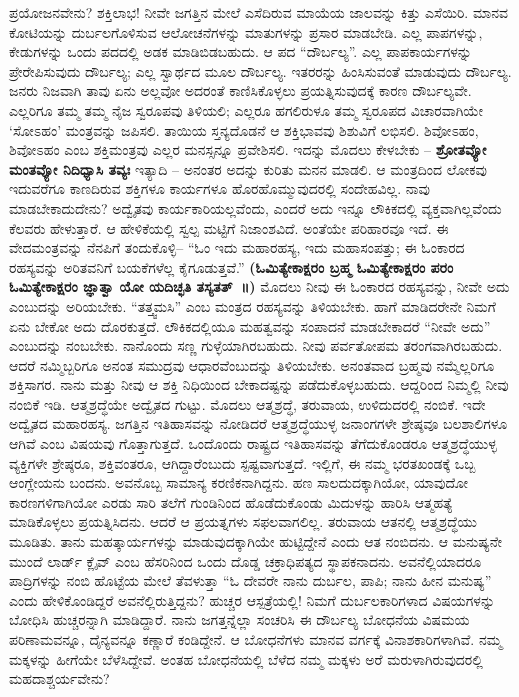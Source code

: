 ಪ್ರಯೋಜನವೇನು? ಶಕ್ತಿಲಾಭ! ನೀವೇ ಜಗತ್ತಿನ ಮೇಲೆ ಎಸೆದಿರುವ ಮಾಯೆಯ ಜಾಲವನ್ನು ಕಿತ್ತು ಎಸೆಯಿರಿ. ಮಾನವ ಕೋಟಿಯನ್ನು ದುರ್ಬಲಗೊಳಿಸುವ ಆಲೋಚನೆಗಳನ್ನು ಮಾತುಗಳನ್ನು ಪ್ರಸಾರ ಮಾಡಬೇಡಿ. ಎಲ್ಲ ಪಾಪಗಳನ್ನು, ಕೇಡುಗಳನ್ನು ಒಂದು ಪದದಲ್ಲಿ ಅಡಕ ಮಾಡಿಬಿಡಬಹುದು. ಆ ಪದ “ದೌರ್ಬಲ್ಯ”. ಎಲ್ಲ ಪಾಪಕಾರ್ಯಗಳನ್ನು ಪ್ರೇರೇಪಿಸುವುದು ದೌರ್ಬಲ್ಯ; ಎಲ್ಲ ಸ್ವಾರ್ಥದ ಮೂಲ ದೌರ್ಬಲ್ಯ. ಇತರರನ್ನು ಹಿಂಸಿಸುವಂತೆ ಮಾಡುವುದು ದೌರ್ಬಲ್ಯ. ಜನರು ನಿಜವಾಗಿ ತಾವು ಏನು ಅಲ್ಲವೋ ಅದರಂತೆ ಕಾಣಿಸಿಕೊಳ್ಳಲು ಪ್ರಯತ್ನಿಸುವುದಕ್ಕೆ ಕಾರಣ ದೌರ್ಬಲ್ಯವೇ. ಎಲ್ಲರಿಗೂ ತಮ್ಮ ತಮ್ಮ ನೈಜ ಸ್ವರೂಪವು ತಿಳಿಯಲಿ; ಎಲ್ಲರೂ ಹಗಲಿರುಳೂ ತಮ್ಮ ಸ್ವರೂಪದ ವಿಚಾರವಾಗಿಯೇ ‘ಸೋಽಹಂ’ ಮಂತ್ರವನ್ನು ಜಪಿಸಲಿ. ತಾಯಿಯ ಸ್ತನ್ಯದೊಡನೆ ಆ ಶಕ್ತಿಭಾವವು ಶಿಶುವಿಗೆ ಲಭಿಸಲಿ. ಶಿವೋಽಹಂ, ಶಿವೋಽಹಂ ಎಂಬ ಶಕ್ತಿಮಂತ್ರವು ಎಲ್ಲರ ಮನಸ್ಸನ್ನೂ ಪ್ರವೇಶಿಸಲಿ. ಇದನ್ನು ಮೊದಲು ಕೇಳಬೇಕು – \textbf{ಶ್ರೋತವ್ಯೋ ಮಂತವ್ಯೋ ನಿದಿಧ್ಯಾಸಿ ತವ್ಯಃ} ಇತ್ಯಾದಿ – ಅನಂತರ ಅದನ್ನು ಕುರಿತು ಮನನ ಮಾಡಲಿ. ಆ ಮಂತ್ರದಿಂದ ಲೋಕವು ಇದುವರೆಗೂ ಕಾಣದಿರುವ ಶಕ್ತಿಗಳೂ ಕಾರ್ಯಗಳೂ ಹೊರಹೊಮ್ಮುವುದರಲ್ಲಿ ಸಂದೇಹವಿಲ್ಲ. ನಾವು ಮಾಡಬೇಕಾದುದೇನು? ಅದ್ವೈತವು ಕಾರ್ಯಕಾರಿಯಲ್ಲವೆಂದು, ಎಂದರೆ ಅದು ಇನ್ನೂ ಲೌಕಿಕದಲ್ಲಿ ವ್ಯಕ್ತವಾಗಿಲ್ಲವೆಂದು ಕೆಲವರು ಹೇಳುತ್ತಾರೆ. ಆ ಹೇಳಿಕೆಯಲ್ಲಿ ಸ್ವಲ್ಪ ಮಟ್ಟಿಗೆ ನಿಜಾಂಶವಿದೆ. ಅಂತೆಯೇ ಪರಿಹಾರವೂ ಇದೆ. ಈ ವೇದಮಂತ್ರವನ್ನು ನೆನಪಿಗೆ ತಂದುಕೊಳ್ಳಿ– “ಓಂ ಇದು ಮಹಾರಹಸ್ಯ, ಇದು ಮಹಾಸಂಪತ್ತು; ಈ ಓಂಕಾರದ ರಹಸ್ಯವನ್ನು ಅರಿತವನಿಗೆ ಬಯಕೆಗಳೆಲ್ಲ ಕೈಗೂಡುತ್ತವೆ.” \textbf{(ಓಮಿತ್ಯೇಕಾಕ್ಷರಂ ಬ್ರಹ್ಮ ಓಮಿತ್ಯೇಕಾಕ್ಷರಂ ಪರಂ ಓಮಿತ್ಯೇಕಾಕ್ಷರಂ ಜ್ಞಾತ್ವಾ ಯೋ ಯದಿಚ್ಛತಿ ತಸ್ಯತತ್​~॥)} ಮೊದಲು ನೀವು ಈ ಓಂಕಾರದ ರಹಸ್ಯವನ್ನು, ನೀವೇ ಅದು ಎಂಬುದನ್ನು ಅರಿಯಬೇಕು. “ತತ್ತ್ವಮಸಿ” ಎಂಬ ಮಂತ್ರದ ರಹಸ್ಯವನ್ನು ತಿಳಿಯಬೇಕು. ಹಾಗೆ ಮಾಡಿದರೇನೇ ನಿಮಗೆ ಏನು ಬೇಕೋ ಅದು ದೊರಕುತ್ತದೆ. ಲೌಕಿಕದಲ್ಲಿಯೂ ಮಹತ್ವವನ್ನು ಸಂಪಾದನೆ ಮಾಡಬೇಕಾದರೆ “ನೀವೇ ಅದು” ಎಂಬುದನ್ನು ನಂಬಬೇಕು. ನಾನೊಂದು ಸಣ್ಣ ಗುಳ್ಳೆಯಾಗಿರಬಹುದು. ನೀವು ಪರ್ವತೋಪಮ ತರಂಗವಾಗಿರಬಹುದು. ಆದರೆ ನಮ್ಮಿಬ್ಬರಿಗೂ ಅನಂತ ಸಮುದ್ರವು ಆಧಾರವೆಂಬುದನ್ನು ತಿಳಿಯಬೇಕು. ಅನಂತವಾದ ಬ್ರಹ್ಮವು ನಮ್ಮೆಲ್ಲರಿಗೂ ಶಕ್ತಿಸಾಗರ. ನಾನು ಮತ್ತು ನೀವು ಆ ಶಕ್ತಿ ನಿಧಿಯಿಂದ ಬೇಕಾದಷ್ಟನ್ನು ಪಡೆದುಕೊಳ್ಳಬಹುದು. ಆದ್ದರಿಂದ ನಿಮ್ಮಲ್ಲಿ ನೀವು ನಂಬಿಕೆ ಇಡಿ. ಆತ್ಮಶ್ರದ್ಧೆಯೇ ಅದ್ವೈತದ ಗುಟ್ಟು. ಮೊದಲು ಆತ್ಮಶ್ರದ್ಧೆ, ತರುವಾಯ, ಉಳಿದುದರಲ್ಲಿ ನಂಬಿಕೆ. ಇದೇ ಅದ್ವೈತದ ಮಹಾರಹಸ್ಯ. ಜಗತ್ತಿನ ಇತಿಹಾಸವನ್ನು ನೋಡಿದರೆ ಆತ್ಮಶ್ರದ್ಧೆಯುಳ್ಳ ಜನಾಂಗಗಳೇ ಶ್ರೇಷ್ಠವೂ ಬಲಶಾಲಿಗಳೂ ಆಗಿವೆ ಎಂಬ ವಿಷಯವು ಗೊತ್ತಾಗುತ್ತದೆ. ಒಂದೊಂದು ರಾಷ್ಟ್ರದ ಇತಿಹಾಸವನ್ನು ತೆಗೆದುಕೊಂಡರೂ ಆತ್ಮಶ್ರದ್ಧೆಯುಳ್ಳ ವ್ಯಕ್ತಿಗಳೇ ಶ್ರೇಷ್ಠರೂ, ಶಕ್ತಿವಂತರೂ, ಆಗಿದ್ದಾರೆಂಬುದು ಸ್ಪಷ್ಟವಾಗುತ್ತದೆ. ಇಲ್ಲಿಗೆ, ಈ ನಮ್ಮ ಭರತಖಂಡಕ್ಕೆ ಒಬ್ಬ ಆಂಗ್ಲೇಯನು ಬಂದನು. ಅವನೊಬ್ಬ ಸಾಮಾನ್ಯ ಕರಣಿಕನಾಗಿದ್ದನು. ಹಣ ಸಾಲದುದಕ್ಕಾಗಿಯೋ, ಯಾವುದೋ ಕಾರಣಗಳಿಗಾಗಿಯೋ ಎರಡು ಸಾರಿ ತಲೆಗೆ ಗುಂಡಿನಿಂದ ಹೊಡೆದುಕೊಂಡು ಮಿದುಳನ್ನು ಹಾರಿಸಿ ಆತ್ಮಹತ್ಯೆ ಮಾಡಿಕೊಳ್ಳಲು ಪ್ರಯತ್ನಿಸಿದನು. ಆದರೆ ಆ ಪ್ರಯತ್ನಗಳು ಸಫಲವಾಗಲಿಲ್ಲ. ತರುವಾಯ ಆತನಲ್ಲಿ ಆತ್ಮಶ್ರದ್ಧೆಯು ಮೂಡಿತು. ತಾನು ಮಹತ್ಕಾರ್ಯಗಳನ್ನು ಮಾಡುವುದಕ್ಕಾಗಿಯೇ ಹುಟ್ಟಿದ್ದೇನೆ ಎಂದು ಆತ ನಂಬಿದನು. ಆ ಮನುಷ್ಯನೇ ಮುಂದೆ ಲಾರ್ಡ್​ ಕ್ಲೈವ್​ ಎಂಬ ಹೆಸರಿನಿಂದ ಒಂದು ದೊಡ್ಡ ಚಕ್ರಾಧಿಪತ್ಯದ ಸ್ಥಾಪಕನಾದನು. ಅವನೆಲ್ಲಿಯಾದರೂ ಪಾದ್ರಿಗಳನ್ನು ನಂಬಿ ಹೊಟ್ಟೆಯ ಮೇಲೆ ತೆವಳುತ್ತಾ “ಓ ದೇವರೇ ನಾನು ದುರ್ಬಲ, ಪಾಪಿ; ನಾನು ಹೀನ ಮನುಷ್ಯ” ಎಂದು ಹೇಳಿಕೊಂಡಿದ್ದರೆ ಅವನೆಲ್ಲಿರುತ್ತಿದ್ದನು? ಹುಚ್ಚರ ಆಸ್ಪತ್ರೆಯಲ್ಲಿ! ನಿಮಗೆ ದುರ್ಬಲಕಾರಿಗಳಾದ ವಿಷಯಗಳನ್ನು ಬೋಧಿಸಿ ಹುಚ್ಚರನ್ನಾಗಿ ಮಾಡಿದ್ದಾರೆ. ನಾನು ಜಗತ್ತನ್ನೆಲ್ಲಾ ಸಂಚರಿಸಿ ಈ ದೌರ್ಬಲ್ಯ ಬೋಧನೆಯ ವಿಷಮಯ ಪರಿಣಾಮವನ್ನೂ, ದೈನ್ಯವನ್ನೂ ಕಣ್ಣಾರೆ ಕಂಡಿದ್ದೇನೆ. ಆ ಬೋಧನೆಗಳು ಮಾನವ ವರ್ಗಕ್ಕೆ ವಿನಾಶಕಾರಿಗಳಾಗಿವೆ. ನಮ್ಮ ಮಕ್ಕಳನ್ನು ಹೀಗೆಯೇ ಬೆಳೆಸಿದ್ದೇವೆ. ಅಂತಹ ಬೋಧನೆಯಲ್ಲಿ ಬೆಳೆದ ನಮ್ಮ ಮಕ್ಕಳು ಅರೆ ಮರುಳಾಗಿರುವುದರಲ್ಲಿ ಮಹದಾಶ್ಚರ್ಯವೇನು?

